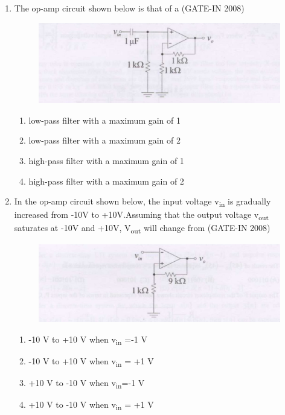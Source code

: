 \documentclass[journal,12pt,onecolumn]{IEEEtran}
\theoremstyle{remark}
\begin{document}
\begin{enumerate}[label=Q.\arabic*,start=1]
    \item  The op-amp circuit shown below is that of a (GATE-IN 2008)
    \begin{figure}[H]
    \centering
    \includegraphics[width=0.5\columnwidth]{figs/i19.jpg}
    \caption{}
    \label{fig:placeholder19}
\end{figure}
\begin{multicols}{2}
    \begin{enumerate} 
        \item low-pass filter with a maximum gain of 1 
        \item low-pass filter with a maximum gain of 2
        \item high-pass filter with a maximum gain of 1 
        \item high-pass filter with a maximum gain of 2
    \end{enumerate}
    \end{multicols}
    
    \item In the op-amp circuit shown below, the input voltage v\textsubscript{in} is gradually increased from -10V to +10V.Assuming that the output voltage v\textsubscript{out} saturates at -10V and +10V, V\textsubscript{out} will change from (GATE-IN 2008)
    
    \begin{figure}[H]
    \centering
    \includegraphics[width=0.5\columnwidth]{figs/i20.jpg}
    \caption{}
    \label{fig:placeholder20}
\end{figure}
\begin{multicols}{2}
    \begin{enumerate} 
        \item -10 V to +10 V when v\textsubscript{in} =-1 V
        \item -10 V to +10 V when v\textsubscript{in} = +1 V
        \item +10 V to -10 V when v\textsubscript{in}=-1 V
        \item +10 V to -10 V when v\textsubscript{in} = +1 V
    \end{enumerate}
    \end{multicols}
    

\end{enumerate}
\end{document}
